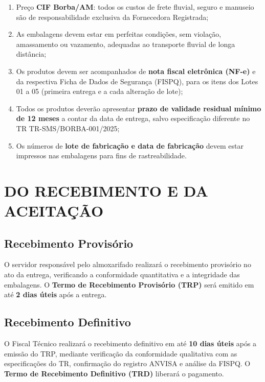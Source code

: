 \documentclass[12pt,a4paper]{article}
\newcommand{\art}[1]{art.\,#1}
\newcommand{\trRef}{TR-SMS/BORBA-001/2025}
\begin{document}
\begin{enumerate}
  \item Preço \textbf{CIF Borba/AM}: todos os custos de frete fluvial,
    seguro e manuseio são de responsabilidade exclusiva da Fornecedora Registrada;
  \item As embalagens devem estar em perfeitas condições, sem violação, amassamento
    ou vazamento, adequadas ao transporte fluvial de longa distância;
  \item Os produtos devem ser acompanhados de \textbf{nota fiscal eletrônica (NF-e)}
    e da respectiva Ficha de Dados de Segurança (FISPQ), para os itens dos
    Lotes 01 a 05 (primeira entrega e a cada alteração de lote);
  \item Todos os produtos deverão apresentar \textbf{prazo de validade residual
    mínimo de 12 meses} a contar da data de entrega, salvo especificação diferente
    no TR \trRef;
  \item Os números de \textbf{lote de fabricação e data de fabricação} devem estar
    impressos nas embalagens para fins de rastreabilidade.
\end{enumerate}

\section{DO RECEBIMENTO E DA ACEITAÇÃO}

\begin{legalbox}[\art{140}, Lei n.\textsuperscript{o} 14.133/2021]
\small
\end{legalbox}

\subsection{Recebimento Provisório}

O servidor responsável pelo almoxarifado realizará o recebimento provisório no ato
da entrega, verificando a conformidade quantitativa e a integridade das embalagens.
O \textbf{Termo de Recebimento Provisório (TRP)} será emitido em até \textbf{2 dias
úteis} após a entrega.

\subsection{Recebimento Definitivo}

O Fiscal Técnico realizará o recebimento definitivo em até \textbf{10 dias úteis}
após a emissão do TRP, mediante verificação da conformidade qualitativa com as
especificações do TR, confirmação do registro ANVISA e análise da FISPQ.
O \textbf{Termo de Recebimento Definitivo (TRD)} liberará o pagamento.
\end{document}
